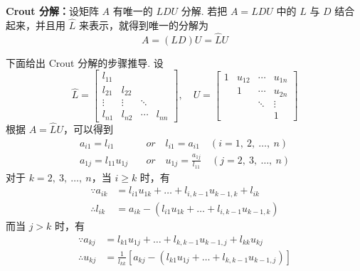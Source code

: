             \par \textbf{Crout 分解：}设矩阵 $A$ 有唯一的 $LDU$ 分解. 若把 $A = LDU$ 中的 $L$ 与 $D$ 结合起来，并且用 $\hat{L}$ 来表示，就得到唯一的分解为
            \begin{equation*}
                A = (LD)U = \hat{L}U
            \end{equation*}
            \par 下面给出 Crout 分解的步骤推导. 设 
            \begin{equation*}
                \hat{L} = \begin{bmatrix}
                    l_{11} & & & \\ l_{21} & l_{22} & & \\ \vdots & \vdots & \ddots & \\ l_{n1} & l_{n2} & \cdots & l_{nn}
                \end{bmatrix}, \quad U = \begin{bmatrix}
                    1 & u_{12} & \cdots & u_{1n} \\ & 1 & \cdots & u_{2n} \\ & & \ddots & \vdots \\ & & & 1
                \end{bmatrix}
            \end{equation*}
            根据 $A = \hat{L}U$，可以得到
            \begin{align*}
                a_{i1} = l_{i1} \quad &or \quad l_{i1} = a_{i1} \quad (i = 1, \ 2, \ \dots, \ n)  \tag{4.1.1}\\
                a_{1j} = l_{11}u_{1j} \quad &or \quad u_{1j} = \frac{a_{1j}}{l_{11}} \quad (j = 2, \ 3, \ \dots, \ n) \tag{4.1.2}
            \end{align*}
            对于 $k = 2, \ 3, \ \dots, \ n$，当 $i \geq k$ 时，有
            \begin{align*}
                \because a_{ik} &= l_{i1}u_{1k} + \dots + l_{i,k-1}u_{k-1,k} + l_{ik} \\
                \therefore l_{ik} &= a_{ik} - (l_{i1}u_{1k} + \dots + l_{i,k-1}u_{k-1,k}) \tag{4.1.3}
            \end{align*}
            而当 $j > k$ 时，有
            \begin{align*}
                \because a_{kj} &= l_{k1}u_{1j} + \dots + l_{k,k-1}u_{k-1,j} + l_{kk}u_{kj} \\
                \therefore u_{kj} &= \frac{1}{l_{kk}}[a_{kj} - (l_{k1}u_{1j} + \dots + l_{k,k-1}u_{k-1,j})] \tag{4.1.4}
            \end{align*}
